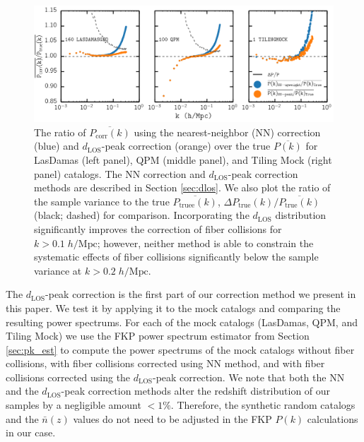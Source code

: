 \documentclass{emulateapj}
\begin{document}
\begin{figure}
\begin{center}
\includegraphics[scale=0.55]{fcpaper_pk_peakonly_comp.png} 
\caption{The ratio of $\overline{P_\mathrm{corr} (k)}$ using the nearest-neighbor (NN) correction (blue) and $d_\mathrm{LOS}$-peak correction (orange) over the true $\overline{P(k)}$ for LasDamas (left panel), QPM (middle panel), and Tiling Mock (right panel) catalogs. The NN correction and $d_\mathrm{LOS}$-peak correction methods are described in Section \ref{sec:dlos}. We also plot the ratio of the sample variance to the true $\overline{P_\mathrm{truee}(k)}$, $\Delta P_\mathrm{true}(k) / \overline{P_\mathrm{true}(k)}$ (black; dashed) for comparison. Incorporating the $d_{\mathrm{LOS}}$ distribution significantly improves the correction of fiber collisions for $k > 0.1 \; h/\mathrm{Mpc}$; however, neither method is able to constrain the systematic effects of fiber collisions significantly below the sample variance at $k > 0.2 \; h/\mathrm{Mpc}$.}\label{fig:peakonly}
\end{center}
\end{figure}

The $d_\mathrm{LOS}$-peak correction is the first part of our correction method we present in this paper. We test it by applying it to the mock catalogs and comparing the resulting power spectrums. For each of the mock catalogs (LasDamas, QPM, and Tiling Mock) we use the FKP power spectrum estimator from Section \ref{sec:pk_est} to compute the power spectrums of the mock catalogs without fiber collisions, with fiber collisions corrected using NN method, and with fiber collisions corrected using the $d_\mathrm{LOS}$-peak correction. We note that both the NN and the $d_\mathrm{LOS}$-peak correction methods alter the redshift distribution of our samples by a negligible amount $< 1\%$. Therefore, the synthetic random catalogs and the $\bar{n}(z)$ values do not need to be adjusted in the FKP $P(k)$ calculations in our case. 
\end{document}

